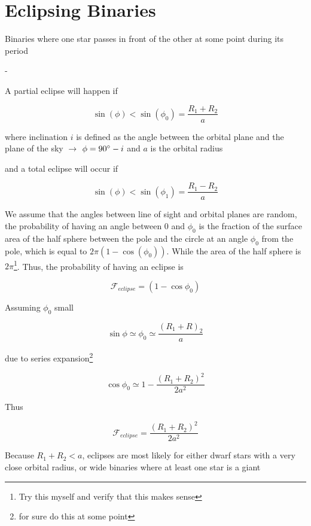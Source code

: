 \section{Eclipsing Binaries}
Binaries where one star passes in front of the other at some point during its period
\begin{list}{-}{}
\item A partial eclipse will happen if  
\item \[\sin(\phi) < \sin(\phi_0) = \frac{R_1+R_2}{a}\]
\item where inclination \(i\) is defined as the angle between the orbital plane and the plane of the sky \(\rightarrow\) \(\phi = 90 \degree - i\) and \(a\) is the orbital radius  
\item and a total eclipse will occur if 
\item \[\sin(\phi) < \sin(\phi_1) = \frac{R_1-R_2}{a}\]
\item We assume that the angles between line of sight and orbital planes are random, the probability of having an angle between 0 and \(\phi_0\) is the fraction of the surface area of the half sphere between the pole and the circle at an angle \(\phi_0\) from the pole, which is equal to \(2\pi(1-\cos(\phi_0))\). While the area of the half sphere is \(2\pi\)\footnote{Try this myself and verify that this makes sense}. Thus, the probability of having an eclipse is 
\item \[\mathcal{F}_{eclipse} = (1-\cos\phi_0)\]
\item Assuming \(\phi_0\) small
\item \[\sin\phi \simeq \phi_0 \simeq \frac{(R_1 +R)_2}{a}\]
\item due to series expansion\footnote{for sure do this at some point}
\item \[\cos\phi_0 \simeq 1 - \frac{(R_1 + R_2)^2}{2a^2}\]
\item Thus
\item \[\mathcal{F}_{eclipse} =\frac{(R_1 + R_2)^2}{2a^2} \]
\item Because \(R_1 +R_2 < a\), eclipses are most likely for either dwarf stars with a  very close orbital radius, or wide binaries where at least one star is a giant 
\end{list}

